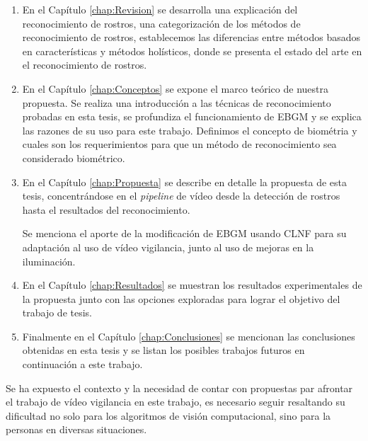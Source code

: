 \begin{enumerate}
\item En el Capítulo \ref{chap:Revision} se desarrolla una explicación del reconocimiento de rostros, una categorización de los métodos de reconocimiento de rostros, establecemos las diferencias entre métodos basados en características y métodos holísticos, donde se presenta el estado del arte en el reconocimiento de rostros.

\item En el Capítulo \ref{chap:Conceptos} se expone el marco teórico de nuestra propuesta. 
Se realiza una introducción a las técnicas de reconocimiento probadas en esta tesis, se profundiza el funcionamiento de \ac{EBGM} y se explica las razones de su uso para este trabajo. Definimos el concepto de biométria y cuales son los requerimientos para que un método de reconocimiento sea considerado biométrico.

\item En el Capítulo \ref{chap:Propuesta} se describe en detalle la propuesta de esta tesis, concentrándose en el \textit{pipeline} de vídeo desde la detección de rostros hasta el resultados del reconocimiento.

Se menciona el aporte de la modificación de \ac{EBGM} usando \ac{CLNF} para su adaptación al uso de vídeo vigilancia, junto al uso de mejoras en la iluminación.

\item En el Capítulo \ref{chap:Resultados} se muestran los resultados experimentales de la propuesta junto con las opciones exploradas para lograr el objetivo del trabajo de tesis.

\item Finalmente en el Capítulo \ref{chap:Conclusiones} se mencionan las conclusiones obtenidas en esta tesis y se listan los posibles trabajos futuros en continuación a este trabajo.
\end{enumerate}

Se ha expuesto el contexto y la necesidad de contar con propuestas par afrontar el trabajo de vídeo vigilancia en este trabajo, es necesario seguir resaltando su dificultad no solo para los algoritmos de visión computacional, sino para la personas en diversas situaciones.
